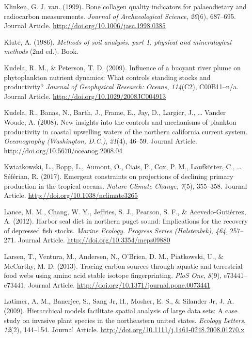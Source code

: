 \documentclass [11pt, proquest] {uwthesis}[2015/03/03]
\begin{document}
\hypertarget{ref-vanKlinken1999}{}
Klinken, G. J. van. (1999). Bone collagen quality indicators for
palaeodietary and radiocarbon measurements. \emph{Journal of
Archaeological Science}, \emph{26}(6), 687--695. Journal Article.
\url{http://doi.org/10.1006/jasc.1998.0385}

\hypertarget{ref-Klute1986}{}
Klute, A. (1986). \emph{Methods of soil analysis. part 1. physical and
mineralogical methods} (2nd ed.). Book.

\hypertarget{ref-Kudela2009}{}
Kudela, R. M., \& Peterson, T. D. (2009). Influence of a buoyant river
plume on phytoplankton nutrient dynamics: What controls standing stocks
and productivity? \emph{Journal of Geophysical Research: Oceans},
\emph{114}(C2), C00B11--n/a. Journal Article.
\url{http://doi.org/10.1029/2008JC004913}

\hypertarget{ref-Kudela2008}{}
Kudela, R., Banas, N., Barth, J., Frame, E., Jay, D., Largier, J.,
\ldots{} Vander Woude, A. (2008). New insights into the controls and
mechanisms of plankton productivity in coastal upwelling waters of the
northern california current system. \emph{Oceanography (Washington,
D.C.)}, \emph{21}(4), 46--59. Journal Article.
\url{http://doi.org/10.5670/oceanog.2008.04}

\hypertarget{ref-Kwiatkowski2017}{}
Kwiatkowski, L., Bopp, L., Aumont, O., Ciais, P., Cox, P. M.,
Laufkötter, C., \ldots{} Séférian, R. (2017). Emergent constraints on
projections of declining primary production in the tropical oceans.
\emph{Nature Climate Change}, \emph{7}(5), 355--358. Journal Article.
\url{http://doi.org/10.1038/nclimate3265}

\hypertarget{ref-Lance2012}{}
Lance, M. M., Chang, W. Y., Jeffries, S. J., Pearson, S. F., \&
Acevedo-Gutiérrez, A. (2012). Harbor seal diet in northern puget sound:
Implications for the recovery of depressed fish stocks. \emph{Marine
Ecology. Progress Series (Halstenbek)}, \emph{464}, 257--271. Journal
Article. \url{http://doi.org/10.3354/meps09880}

\hypertarget{ref-Larsen2013}{}
Larsen, T., Ventura, M., Andersen, N., O'Brien, D. M., Piatkowski, U.,
\& McCarthy, M. D. (2013). Tracing carbon sources through aquatic and
terrestrial food webs using amino acid stable isotope fingerprinting.
\emph{PloS One}, \emph{8}(9), e73441--e73441. Journal Article.
\url{http://doi.org/10.1371/journal.pone.0073441}

\hypertarget{ref-Latimer2009}{}
Latimer, A. M., Banerjee, S., Sang Jr, H., Mosher, E. S., \& Silander
Jr, J. A. (2009). Hierarchical models facilitate spatial analysis of
large data sets: A case study on invasive plant species in the
northeastern united states. \emph{Ecology Letters}, \emph{12}(2),
144--154. Journal Article.
\url{http://doi.org/10.1111/j.1461-0248.2008.01270.x}
\end{document}
